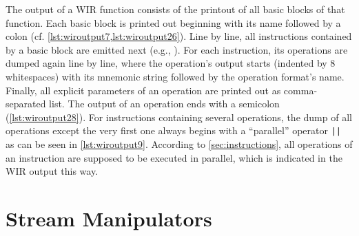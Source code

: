 The output of a \gls{WIR} function consists of the printout of all basic blocks of that function.
Each basic block is printed out beginning with its name followed by a colon (cf. \cref{lst:wiroutput7,lst:wiroutput26}).
Line by line, all instructions contained by a basic block are emitted next (e.g., ).
For each instruction, its operations are dumped again line by line, where the operation's output starts (indented by 8 whitespaces) with its mnemonic string followed by the operation format's name.
Finally, all explicit parameters of an operation are printed out as comma-separated list.
The output of an operation ends with a semicolon (\cref{lst:wiroutput28}).
For instructions containing several operations, the dump of all operations except the very first one always begins with a ``parallel'' operator \texttt{||} as can be seen in \cref{lst:wiroutput9}.
According to \cref{sec:instructions}, all operations of an instruction are supposed to be executed in parallel, which is indicated in the \gls{WIR} output this way.


\section{Stream Manipulators}
\label{sec:streammanip}

